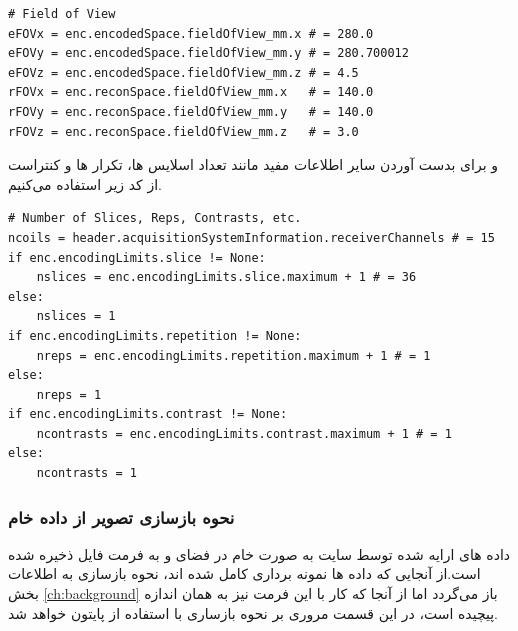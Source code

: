 \begin{latin}
\begin{lstlisting}
# Field of View 
eFOVx = enc.encodedSpace.fieldOfView_mm.x # = 280.0
eFOVy = enc.encodedSpace.fieldOfView_mm.y # = 280.700012
eFOVz = enc.encodedSpace.fieldOfView_mm.z # = 4.5
rFOVx = enc.reconSpace.fieldOfView_mm.x   # = 140.0 
rFOVy = enc.reconSpace.fieldOfView_mm.y   # = 140.0
rFOVz = enc.reconSpace.fieldOfView_mm.z   # = 3.0
\end{lstlisting}
\end{latin}
و برای بدست آوردن سایر اطلاعات مفید مانند تعداد اسلایس ها، تکرار ها و کنتراست از کد زیر استفاده می‌کنیم.

\begin{latin}
\begin{lstlisting}
# Number of Slices, Reps, Contrasts, etc.
ncoils = header.acquisitionSystemInformation.receiverChannels # = 15
if enc.encodingLimits.slice != None:
	nslices = enc.encodingLimits.slice.maximum + 1 # = 36
else:
	nslices = 1
if enc.encodingLimits.repetition != None:
	nreps = enc.encodingLimits.repetition.maximum + 1 # = 1
else:
	nreps = 1
if enc.encodingLimits.contrast != None:
	ncontrasts = enc.encodingLimits.contrast.maximum + 1 # = 1
else:
	ncontrasts = 1
\end{lstlisting}
\end{latin}

\subsubsection{نحوه بازسازی تصویر از داده خام}
داده های ارایه شده توسط سایت 
به صورت خام در فضای \kspace و به فرمت فایل 
ذخیره شده است.از آنجایی که داده ها نمونه برداری کامل شده اند، نحوه بازسازی به اطلاعات بخش \ref{ch:background}
باز می‌گردد اما از آنجا که کار با این فرمت نیز به همان اندازه پیچیده است، در این قسمت مروری بر نحوه بازساری با استفاده از پایتون خواهد شد. 

